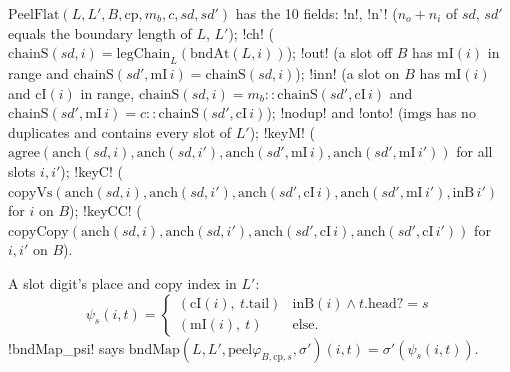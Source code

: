 \begin{definition}\label{def:lean-sym-peelflat}
$\mathrm{PeelFlat}(L,L',B,\mathrm{cp},m_b,c,\mathit{sd},\mathit{sd}')$ has the 10 fields: \lean!n!, \lean!n'! ($n_o+n_i$ of $\mathit{sd}$, $\mathit{sd}'$ equals the boundary length of $L$, $L'$); \lean!ch! ($\mathrm{chainS}(\mathit{sd},i)=\mathrm{legChain}_L(\mathrm{bndAt}(L,i))$); \lean!out! (a slot off $B$ has $\mathrm{mI}(i)$ in range and $\mathrm{chainS}(\mathit{sd}',\mathrm{mI}\,i)=\mathrm{chainS}(\mathit{sd},i)$); \lean!inn! (a slot on $B$ has $\mathrm{mI}(i)$ and $\mathrm{cI}(i)$ in range, $\mathrm{chainS}(\mathit{sd},i)=m_b\mathbin{::}\mathrm{chainS}(\mathit{sd}',\mathrm{cI}\,i)$ and $\mathrm{chainS}(\mathit{sd}',\mathrm{mI}\,i)=c\mathbin{::}\mathrm{chainS}(\mathit{sd}',\mathrm{cI}\,i)$); \lean!nodup! and \lean!onto! ($\mathrm{imgs}$ has no duplicates and contains every slot of $L'$); \lean!keyM! ($\mathrm{agree}(\mathrm{anch}(\mathit{sd},i),\mathrm{anch}(\mathit{sd},i'),\mathrm{anch}(\mathit{sd}',\mathrm{mI}\,i),\mathrm{anch}(\mathit{sd}',\mathrm{mI}\,i'))$ for all slots $i,i'$); \lean!keyC! ($\mathrm{copyVs}(\mathrm{anch}(\mathit{sd},i),\mathrm{anch}(\mathit{sd},i'),\mathrm{anch}(\mathit{sd}',\mathrm{cI}\,i),\mathrm{anch}(\mathit{sd}',\mathrm{mI}\,i'),\mathrm{inB}\,i')$ for $i$ on $B$); \lean!keyCC! ($\mathrm{copyCopy}(\mathrm{anch}(\mathit{sd},i),\mathrm{anch}(\mathit{sd},i'),\mathrm{anch}(\mathit{sd}',\mathrm{cI}\,i),\mathrm{anch}(\mathit{sd}',\mathrm{cI}\,i'))$ for $i,i'$ on $B$).
\end{definition}

\begin{definition}
A slot digit's place and copy index in $L'$:
\[
\psi_s(i,t)=\begin{cases}(\mathrm{cI}(i),\ t.\mathrm{tail})&\mathrm{inB}(i)\land t.\mathrm{head?}=s\\(\mathrm{mI}(i),\ t)&\text{else.}\end{cases}
\]
\lean!bndMap_psi! says $\mathrm{bndMap}(L,L',\mathrm{peel}\varphi_{B,\mathrm{cp},s},\sigma')(i,t)=\sigma'(\psi_s(i,t))$.
\end{definition}

